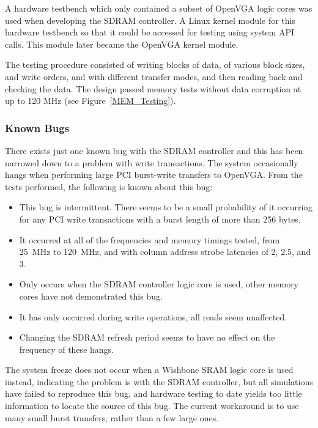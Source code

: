A hardware testbench which only contained a subset of OpenVGA logic cores was
used when developing the SDRAM controller. A Linux kernel module for this
hardware testbench so that it could be accessed for testing using system API
calls. This module later became the OpenVGA kernel module.

The testing procedure consisted of writing blocks of data, of various block
sizes, and write orders, and with different transfer modes, and then reading back
and checking the data. The design passed memory tests without data corruption at
up to 120 MHz (see Figure~\ref{MEM_Testing}).


\subsubsection{Known Bugs}
\label{SDRAM_Bug}

There exists just one known bug with the SDRAM controller and this has been
narrowed down to a problem with write transactions. The system occasionally hangs
when performing large PCI burst-write transfers to OpenVGA. From the tests
performed, the following is known about this bug:

\begin{itemize}
  \item This bug is intermittent. There seems to be a small probability of it
  occurring for any PCI write transactions with a burst length of more than 256
  bytes.
  \item It occurred at all of the frequencies and memory timings tested, from
  25~MHz to 120~MHz, and with column address strobe latencies of 2, 2.5, and 3.
  \item Only occurs when the SDRAM controller logic core is used, other memory
  cores have not demonstrated this bug.
  \item It has only occurred during write operations, all reads seem unaffected.
  \item Changing the SDRAM refresh period seems to have no effect on the
  frequency of these hangs.
\end{itemize}

The system freeze does not occur when a Wishbone SRAM logic core is used instead,
indicating the problem is with the SDRAM controller, but all simulations have
failed to reproduce this bug, and hardware testing to date yields too little
information to locate the source of this bug. The current workaround is to use
many small burst transfers, rather than a few large ones.


